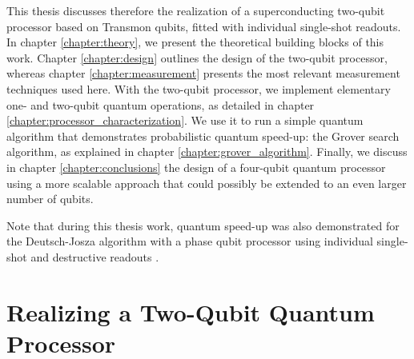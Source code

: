 \smallskip

This thesis discusses therefore the realization of
a superconducting two-qubit processor based on Transmon qubits, fitted
with individual single-shot readouts. In chapter \ref{chapter:theory}, we present the theoretical building blocks of this work. Chapter \ref{chapter:design} outlines the design of the two-qubit processor, whereas chapter \ref{chapter:measurement} presents the most relevant measurement techniques used here. With the two-qubit processor, we implement
elementary one- and two-qubit quantum operations, as detailed in chapter \ref{chapter:processor_characterization}. We use it to run
a simple quantum algorithm that demonstrates probabilistic quantum
speed-up: the Grover search algorithm, as explained in chapter \ref{chapter:grover_algorithm}. Finally, we discuss in chapter \ref{chapter:conclusions} the design of a four-qubit quantum processor using a more scalable approach that
could possibly be extended to an even larger number of qubits.

Note that during this thesis work, quantum speed-up
was also demonstrated for the Deutsch-Josza algorithm with a phase
qubit processor using individual single-shot and destructive readouts
\citep{yamamoto_quantum_2010}.


\section{Realizing a Two-Qubit Quantum Processor}

